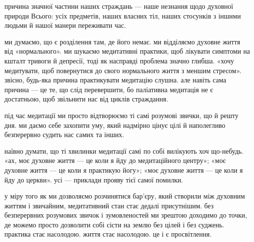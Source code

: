 причина значної частини наших страждань --- наше незнання щодо духовної природи Всього: усіх предметів, наших власних тіл, наших стосунків з іншими людьми й нашої манери переживати час.

ми думаємо, що є розділення там, де його немає. ми відділяємо духовне життя від «нормального». ми шукаємо медитативні практики, щоб лікувати симптоми на кшталт тривоги й депресії, тоді як насправді проблема значно глибша. «хочу медитувати, щоб повернутися до свого нормального життя з меншим стресом». звісно, будь-яка причина практикувати медитацію слушна. але навіть сама причина --- це те, що слід перевершити, бо паліативна медитація не є достатньою, щоб звільнити нас від циклів страждання.

під час медитації ми просто відтворюємо ті самі розумові звички, що й решту дня. ми даємо себе захопити уму, який надмірно цінує цілі й наполегливо безперервно судить нас самих та інших.

наївно думати, що ті хвилинки медитації самі по собі вилікують хоч що-небудь. «ах, моє духовне життя --- це коли я йду до медитаційного центру»; «моє духовне життя --- це коли я практикую йогу»; «моє духовне життя --- це коли я йду до церкви». усі --- приклади прояву тієї самої помилки.

у міру того як ми дозволяємо розчинятися бар'єру, який створили між духовним життям і звичайним, медитативний стан стає дедалі присутнішим. без безперервних розумових звичок і зумовленостей ми зрештою доходимо до точки, де можемо просто дозволити собі сісти на землю без цілей і без суджень. практика стає насолодою. життя стає насолодою. це і є просвітлення.

